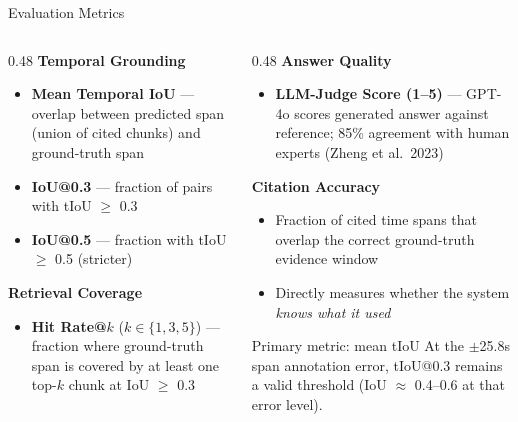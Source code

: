 \documentclass[aspectratio=169,t]{beamer}
\begin{document}
\begin{frame}{Evaluation Metrics}

\begin{columns}[T]
\begin{column}{0.48\textwidth}
  \textbf{Temporal Grounding}
  \begin{itemize}
    \item \textbf{Mean Temporal IoU} — overlap between predicted span (union of cited chunks)
          and ground-truth span
    \item \textbf{IoU@0.3} — fraction of pairs with tIoU $\geq$ 0.3
    \item \textbf{IoU@0.5} — fraction with tIoU $\geq$ 0.5 (stricter)
  \end{itemize}

  \medskip
  \textbf{Retrieval Coverage}
  \begin{itemize}
    \item \textbf{Hit Rate@$k$} ($k \in \{1,3,5\}$) — fraction where ground-truth span
          is covered by at least one top-$k$ chunk at IoU $\geq$ 0.3
  \end{itemize}
\end{column}
\begin{column}{0.48\textwidth}
  \textbf{Answer Quality}
  \begin{itemize}
    \item \textbf{LLM-Judge Score (1--5)} — GPT-4o scores generated answer
          against reference; 85\% agreement with human experts (Zheng et al.\ 2023)
  \end{itemize}

  \medskip
  \textbf{Citation Accuracy}
  \begin{itemize}
    \item Fraction of cited time spans that overlap the correct ground-truth evidence window
    \item Directly measures whether the system \emph{knows what it used}
  \end{itemize}

  \medskip
  \begin{exampleblock}{Primary metric: mean tIoU}
    At the $\pm$25.8s span annotation error, tIoU@0.3 remains a valid threshold
    (IoU $\approx$ 0.4--0.6 at that error level).
  \end{exampleblock}
\end{column}
\end{columns}

\end{frame}
\end{document}

